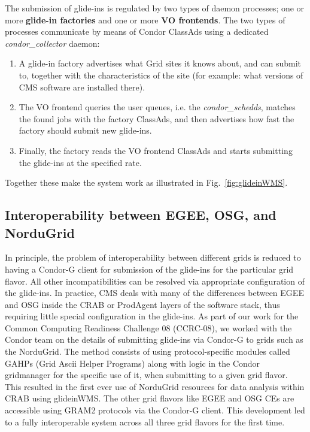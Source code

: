 \documentclass[a4paper]{jpconf}
\begin{document}
The submission of glide-ins is regulated by two types of daemon processes; 
one or more \textbf{glide-in factories} and one or more \textbf{VO frontends}. 
The two types of processes communicate by means of Condor ClassAds using a dedicated \emph{condor\_collector} daemon:
\begin{enumerate}
\item A glide-in factory advertises what Grid sites it knows about, and can submit to, together with the characteristics of the site 
(for example: what versions of CMS software are installed there).
\item The VO frontend queries the user queues, i.e. the \emph{condor\_schedds}, 
matches the found jobs with the factory ClassAds, 
and then advertises how fast the factory should submit new glide-ins.
\item Finally, the factory reads the VO frontend ClassAds and starts submitting the glide-ins at the specified rate.
\end{enumerate}

Together these make the system work as illustrated in Fig.~\ref{fig:glideinWMS}.
\subsection {Interoperability between EGEE, OSG, and NorduGrid}
In principle, the problem of interoperability between different grids is reduced to having a Condor-G client
for submission of the glide-ins for the particular grid flavor. All other incompatibilities can be 
resolved via appropriate configuration of the glide-ins. In practice, CMS deals with many of the differences 
between EGEE and OSG inside the CRAB or ProdAgent layers of the software stack, thus requiring little special 
configuration in the glide-ins. As part of our work for the Common Computing Readiness Challenge 08 (CCRC-08), we worked 
with the Condor team on the details of submitting glide-ins via Condor-G to grids such as the NorduGrid. The method 
consists of using protocol-specific modules called GAHPs (Grid Ascii Helper Programs) along with logic in the Condor gridmanager for the 
specific use of it, when submitting to a given grid flavor. This resulted 
in the first ever use of NorduGrid resources for data analysis within CRAB using glideinWMS. The other grid flavors like 
EGEE and OSG CEs are accessible using GRAM2 protocols via the Condor-G client. This development led to
a fully interoperable system across all three grid flavors for the first time.
\end{document}
